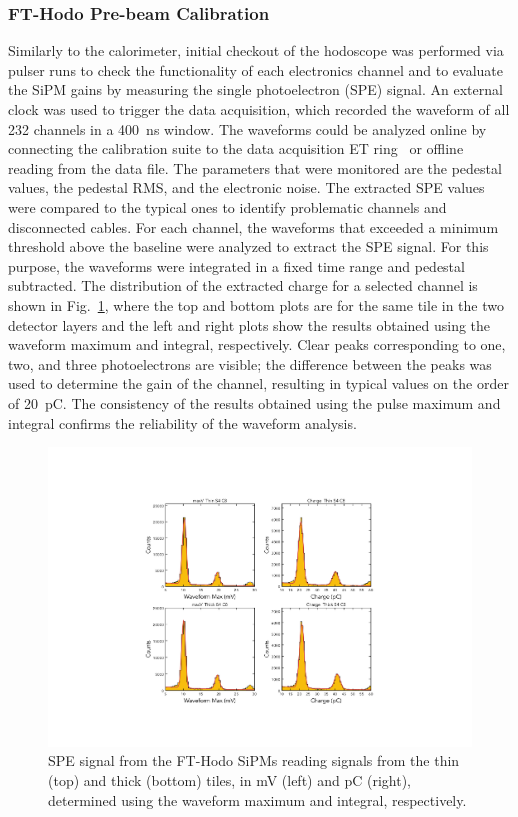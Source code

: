 \subsubsection{FT-Hodo Pre-beam Calibration}

Similarly to the calorimeter, initial checkout of the hodoscope was performed via pulser runs to check the
functionality of each electronics channel and to evaluate the SiPM gains by measuring the single photoelectron (SPE)
signal. An external clock was used to trigger the data acquisition, which recorded the waveform of all 232 channels
in a 400~ns window. The waveforms could be analyzed online by connecting the calibration suite to the data acquisition
ET ring~\cite{daq} or offline reading from the data file. The parameters that were monitored are the pedestal
values, the pedestal RMS, and the electronic noise. The extracted SPE values were compared to the typical ones to
identify problematic channels and disconnected cables. For each channel, the waveforms that exceeded a minimum
threshold above the baseline were analyzed to extract the SPE signal. For this purpose, the waveforms were
integrated in a fixed time range and pedestal subtracted. The distribution of the extracted charge for a selected
channel is shown in Fig.~\ref{fig:fthodo_spe}, where the top and bottom plots are for the same tile in the two detector
layers and the left and right plots show the results obtained using the waveform maximum and integral, respectively.
Clear peaks corresponding to one, two, and three photoelectrons are visible; the difference between the peaks was
used to determine the gain of the channel, resulting in typical values on the order of 20~pC. The consistency of the
results obtained using the pulse maximum and integral confirms the reliability of the waveform analysis.

\begin{figure}
\includegraphics[width=1.0\columnwidth]{fig/fthodo_spe_2.pdf}
\caption{SPE signal from the FT-Hodo SiPMs reading signals from the thin (top) and thick (bottom) tiles, in mV
  (left) and pC (right), determined using the waveform maximum and integral, respectively.}
\label{fig:fthodo_spe}
\end{figure}

